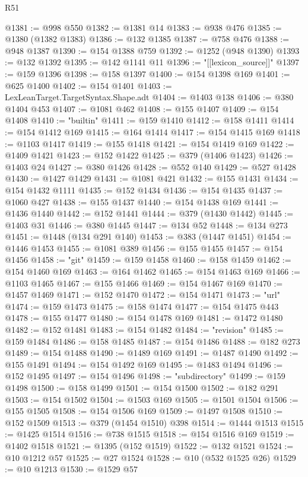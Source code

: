 \begin{lexlean}{R51}
\begin{coremodule}
@1381 := @998 @550
@1382 := @1381 @14
@1383 := @938 @476
@1385 := @1380 (@1382 @1383)
@1386 := @132 @1385
@1387 := @758 @476
@1388 := @948 @1387
@1390 := @154 @1388 @759
@1392 := @1252 (@948 @1390)
@1393 := @132 @1392
@1395 := @142 @1141 @11
@1396 := "[[lexicon_source]]"
@1397 := @159 @1396
@1398 := @158 @1397
@1400 := @154 @1398 @169
@1401 := @625 @1400
@1402 := @154 @1401
@1403 := LexLeanTarget.TargetSyntax.Shape.adt
@1404 := @1403 @138
@1406 := @380 @1404 @453
@1407 := @1081 @462
@1408 := @155 @1407
@1409 := @154 @1408
@1410 := "builtin"
@1411 := @159 @1410
@1412 := @158 @1411
@1414 := @154 @1412 @169
@1415 := @164 @1414
@1417 := @154 @1415 @169
@1418 := @1103 @1417
@1419 := @155 @1418
@1421 := @154 @1419 @169
@1422 := @1409 @1421
@1423 := @152 @1422
@1425 := @379 (@1406 @1423)
@1426 := @1403 @24
@1427 := @380 @1426
@1428 := @552 @140
@1429 := @527 @1428
@1430 := @1427 @1429
@1431 := @1081 @421
@1432 := @155 @1431
@1434 := @154 @1432 @1111
@1435 := @152 @1434
@1436 := @154 @1435
@1437 := @1060 @427
@1438 := @155 @1437
@1440 := @154 @1438 @169
@1441 := @1436 @1440
@1442 := @152 @1441
@1444 := @379 (@1430 @1442)
@1445 := @1403 @31
@1446 := @380 @1445
@1447 := @134 @52
@1448 := @134 @273
@1451 := @1448 (@134 @291 @140)
@1453 := @383 (@1447 @1451)
@1454 := @1446 @1453
@1455 := @1081 @389
@1456 := @155 @1455
@1457 := @154 @1456
@1458 := "git"
@1459 := @159 @1458
@1460 := @158 @1459
@1462 := @154 @1460 @169
@1463 := @164 @1462
@1465 := @154 @1463 @169
@1466 := @1103 @1465
@1467 := @155 @1466
@1469 := @154 @1467 @169
@1470 := @1457 @1469
@1471 := @152 @1470
@1472 := @154 @1471
@1473 := "url"
@1474 := @159 @1473
@1475 := @158 @1474
@1477 := @154 @1475 @443
@1478 := @155 @1477
@1480 := @154 @1478 @169
@1481 := @1472 @1480
@1482 := @152 @1481
@1483 := @154 @1482
@1484 := "revision"
@1485 := @159 @1484
@1486 := @158 @1485
@1487 := @154 @1486
@1488 := @182 @273
@1489 := @154 @1488
@1490 := @1489 @169
@1491 := @1487 @1490
@1492 := @155 @1491
@1494 := @154 @1492 @169
@1495 := @1483 @1494
@1496 := @152 @1495
@1497 := @154 @1496
@1498 := "subdirectory"
@1499 := @159 @1498
@1500 := @158 @1499
@1501 := @154 @1500
@1502 := @182 @291
@1503 := @154 @1502
@1504 := @1503 @169
@1505 := @1501 @1504
@1506 := @155 @1505
@1508 := @154 @1506 @169
@1509 := @1497 @1508
@1510 := @152 @1509
@1513 := @379 (@1454 @1510) @398
@1514 := @1444 @1513
@1515 := @1425 @1514
@1516 := @738 @1515
@1518 := @154 @1516 @169
@1519 := @1402 @1518
@1521 := @1395 (@152 @1519)
@1522 := @132 @1521
@1524 := @10 @1212 @57
@1525 := @27 @1524
@1528 := @10 (@532 @1525 @26)
@1529 := @10 @1213
@1530 := @1529 @57

\end{coremodule}
\end{lexlean}
